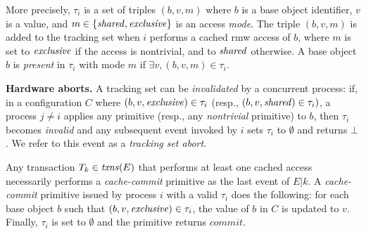 More precisely, $\tau_i$ is a set of triples $(b, v, m)$ where $b$ is a base object identifier, $v$ is a value, 
and $m \in \{\mathit{shared}, \mathit{exclusive}\}$ is an access \emph{mode}. 
The triple $(b, v, m)$ is added to the tracking set when $i$ performs a cached
rmw access of $b$, where $m$ is set to $\mathit{exclusive}$ if the access is
nontrivial, and to $\mathit{shared}$ otherwise.  
A base object $b$ is \emph{present} in $\tau_i$ with mode $m$ if $\exists v, (b,v,m) \in \tau_i$.

%

\vspace{1mm}\noindent\textbf{Hardware aborts.}
A tracking set can be \emph{invalidated} by a concurrent process: 
if, in a configuration $C$ where  $(b,v,\mathit{exclusive})\in\tau_i$
(resp., $(b,v,\mathit{shared})\in\tau_i)$,  a process $j\neq i$ applies any primitive 
(resp., any \emph{nontrivial} primitive) to $b$, then $\tau_i$ becomes
\emph{invalid} and any subsequent event invoked by $i$
sets $\tau_i$ to $\emptyset$ and returns $\bot$. We refer to this event as a \emph{tracking set abort}.

Any transaction $T_k \in \ms{txns}(E)$ that performs at least one cached access necessarily performs a \emph{cache-commit} primitive as the last event of $E|k$. 
A \emph{cache-commit} primitive issued by process $i$ with
a valid $\tau_i$ does the following: for each base object $b$ such that $(b,v,\mathit{exclusive}) \in \tau_i$, the value of $b$ in $C$ is updated to $v$. 
Finally, $\tau_i$ is set to $\emptyset$ and the primitive 
returns $\textit{commit}$. 

